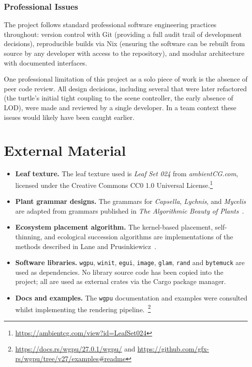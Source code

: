 \begin{appendices}
\subsection{Professional Issues}

The project follows standard professional software engineering practices throughout: version control with Git
(providing a full audit trail of development decisions), reproducible builds via Nix (ensuring the software
can be rebuilt from source by any developer with access to the repository), and modular architecture with
documented interfaces.

\medskip
One professional limitation of this project as a solo piece of work is the absence of peer code review. All
design decisions, including several that were later refactored (the turtle's initial tight coupling to the
scene controller, the early absence of LOD), were made and reviewed by a single developer. In a team context
these issues would likely have been caught earlier.

\chapter{External Material}
\label{app:external}

\begin{itemize}
  \item \textbf{Leaf texture.} The leaf texture used is \textit{Leaf Set 024} from \textit{ambientCG.com},
    licensed under the Creative Commons CC0 1.0 Universal
    License.\footnote{\url{https://ambientcg.com/view?id=LeafSet024}}
  \item \textbf{Plant grammar designs.} The grammars for \textit{Capsella}, \textit{Lychnis}, and
    \textit{Mycelis} are adapted from grammars published in \textit{The Algorithmic Beauty of
    Plants}~\cite{prusinkiewiczAlgorithmicBeautyPlants1990}.
  \item \textbf{Ecosystem placement algorithm.} The kernel-based placement, self-thinning, and ecological
    succession algorithms are implementations of the methods described in Lane and
    Prusinkiewicz~\cite{laneGeneratingSpatialDistributions2002}.
  \item \textbf{Software libraries.} \texttt{wgpu}, \texttt{winit}, \texttt{egui}, \texttt{image},
    \texttt{glam}, \texttt{rand} and \texttt{bytemuck} are used as dependencies. No library source code has
    been copied into the project; all are used as external crates via the Cargo package manager.
  \item \textbf{Docs and examples.} The \texttt{wgpu} documentation and examples were consulted whilst
    implementing the rendering pipeline.~\footnote{\url{https://docs.rs/wgpu/27.0.1/wgpu/} and
    \url{https://github.com/gfx-rs/wgpu/tree/v27/examples#readme}}
\end{itemize}


\end{appendices}
